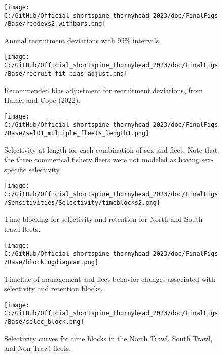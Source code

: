 \documentclass[11pt,
  english,
  letterpaper,
]{article}
\begin{document}
\begin{figure}
\centering
\texttt{[image: C:/GitHub/Official\_shortspine\_thornyhead\_2023/doc/FinalFigs/Base/recdevs2\_withbars.png]}
\caption{Annual recruitment deviations with 95\% intervals.\label{fig:recdevs}}
\end{figure}

\begin{figure}
\centering
\texttt{[image: C:/GitHub/Official\_shortspine\_thornyhead\_2023/doc/FinalFigs/Base/recruit\_fit\_bias\_adjust.png]}
\caption{Recommended bias adjustment for recruitment deviations, from Hamel and Cope (2022).\label{fig:recdevs_bias_adjust}}
\end{figure}

\begin{figure}
\centering
\texttt{[image: C:/GitHub/Official\_shortspine\_thornyhead\_2023/doc/FinalFigs/Base/sel01\_multiple\_fleets\_length1.png]}
\caption{Selectivity at length for each combination of sex and fleet. Note that the three commerical fishery fleets were not modeled as having sex-specific selectivity.\label{fig:selcurvs}}
\end{figure}

\begin{figure}
\centering
\texttt{[image: C:/GitHub/Official\_shortspine\_thornyhead\_2023/doc/FinalFigs/Sensitivities/Selectivity/timeblocks2.png]}
\caption{Time blocking for selectivity and retention for North and South trawl fleets.\label{fig:timeblocks}}
\end{figure}

\begin{figure}
\centering
\texttt{[image: C:/GitHub/Official\_shortspine\_thornyhead\_2023/doc/FinalFigs/Base/blockingdiagram.png]}
\caption{Timeline of management and fleet behavior changes associated with selectivity and retention blocks.\label{fig:diagram}}
\end{figure}

\begin{figure}
\centering
\texttt{[image: C:/GitHub/Official\_shortspine\_thornyhead\_2023/doc/FinalFigs/Base/selec\_block.png]}
\caption{Selectivity curves for time blocks in the North Trawl, South Trawl, and Non-Trawl fleets.\label{fig:selblocks}}
\end{figure}
\end{document}
